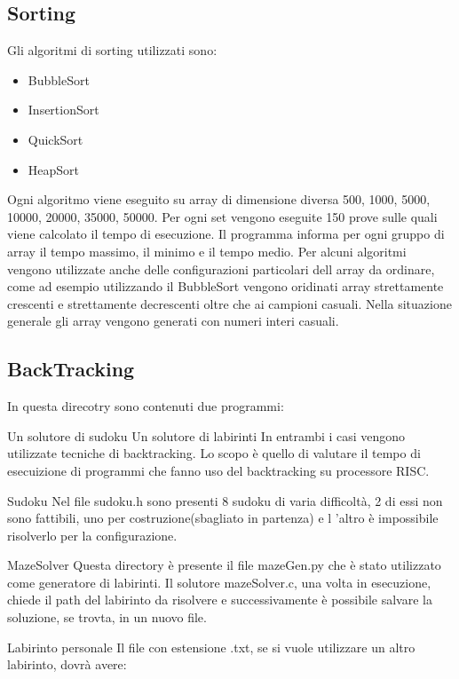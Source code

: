 \documentclass[12pt,a4paper]{report}
\begin{document}
\subsection{Sorting}
Gli algoritmi di sorting utilizzati sono:
\begin{itemize}
	\item BubbleSort
	\item InsertionSort
	\item QuickSort
	\item HeapSort
\end{itemize}

Ogni algoritmo viene eseguito su array di dimensione diversa 500, 1000, 5000, 10000, 20000, 35000, 50000. Per ogni set vengono eseguite 150 prove sulle quali viene calcolato il tempo di esecuzione. Il programma informa per ogni gruppo di array il tempo massimo, il minimo e il tempo medio. Per alcuni algoritmi vengono utilizzate anche delle configurazioni particolari dell array da ordinare, come ad esempio utilizzando il BubbleSort vengono oridinati array strettamente crescenti e strettamente decrescenti oltre che ai campioni casuali. Nella situazione generale gli array vengono generati con numeri interi casuali.


\subsection{BackTracking}

In questa direcotry sono contenuti due programmi:

Un solutore di sudoku
Un solutore di labirinti
In entrambi i casi vengono utilizzate tecniche di backtracking. Lo scopo è quello di valutare il tempo di esecuizione di programmi che fanno uso del backtracking su processore RISC.

Sudoku
Nel file sudoku.h sono presenti 8 sudoku di varia difficoltà, 2 di essi non sono fattibili, uno per costruzione(sbagliato in partenza) e l 'altro è impossibile risolverlo per la configurazione.

MazeSolver
Questa directory è presente il file mazeGen.py che è stato utilizzato come generatore di labirinti. Il solutore mazeSolver.c, una volta in esecuzione, chiede il path del labirinto da risolvere e successivamente è possibile salvare la soluzione, se trovta, in un nuovo file.

Labirinto personale
Il file con estensione .txt, se si vuole utilizzare un altro labirinto, dovrà avere:
\end{document}

